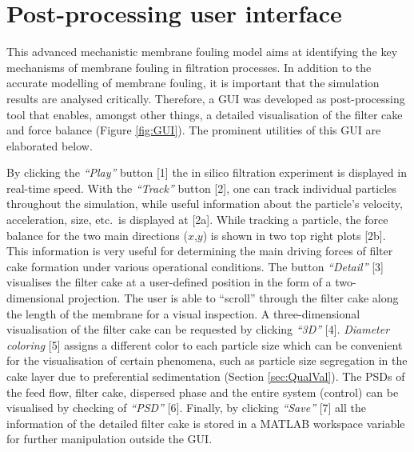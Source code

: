 \section{Post-processing user interface}
This advanced mechanistic membrane fouling model aims at identifying the key mechanisms of membrane fouling in filtration processes. In addition to the accurate modelling of membrane fouling, it is important that the simulation results are analysed critically. Therefore, a \gls{GUI} was developed as post-processing tool that enables, amongst other things, a detailed visualisation of the filter cake and force balance (Figure \ref{fig:GUI}). The prominent utilities of this \gls{GUI} are elaborated below. \par
By clicking the \textit{``Play''} button [1] the in silico filtration experiment is displayed in real-time speed. 
With the \textit{``Track''} button [2], one can track individual particles throughout the simulation, while useful information about the particle's velocity, acceleration, size, etc.\ is displayed at [2a]. While tracking a particle, the force balance for the two main directions ($x$,$y$) is shown in two top right plots [2b]. This information is very useful for determining the main driving forces of filter cake formation under various operational conditions. The button \textit{``Detail''} [3] visualises the filter cake at a user-defined position in the form of a two-dimensional projection. The user is able to ``scroll'' through the filter cake along the length of the membrane for a visual inspection. A three-dimensional visualisation of the filter cake can be requested by clicking \textit{``3D''} [4]. 
\textit{Diameter coloring} [5] assigns a different color to each particle size which can be convenient for the visualisation of certain phenomena, such as particle size segregation in the cake layer due to preferential sedimentation (Section \ref{sec:QualVal}). The \gls{PSD}s of the feed flow, filter cake, dispersed phase and the entire system (control) can be visualised by checking of \textit{``PSD''} [6]. 
Finally, by clicking
\textit{``Save''} [7] all the information of the detailed filter cake is stored in a MATLAB workspace variable for further manipulation outside the \gls{GUI}.

\begin{sidewaysfigure}
    \centering
    \def\svgwidth{\columnwidth}
    
    \caption{Graphical user interface for post-processing. Note that the bottom right plot of the filter cake is a two-dimensional projection, there is no overlap of particles.}
    \label{fig:GUI}
\end{sidewaysfigure}

